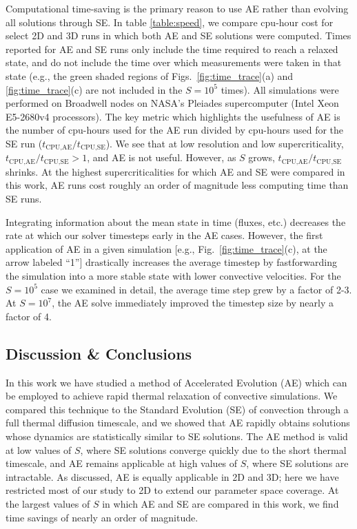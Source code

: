 Computational time-saving is the primary reason to use AE rather than 
evolving all solutions through SE.
In table 
\ref{table:speed}, we compare cpu-hour cost for select
2D and 3D runs in which both AE and SE solutions were computed. Times reported
for AE and SE runs only include the time required to reach a relaxed
state, and do not include the time over which measurements were taken
in that state (e.g., the green shaded regions of
Figs.~\ref{fig:time_trace}(a) and \ref{fig:time_trace}(c) are not included in the $S = 10^5$ times).
All simulations
were performed on Broadwell nodes on NASA's Pleiades supercomputer 
(Intel Xeon E5-2680v4 processors). The key metric which highlights the usefulness
of AE is the number of cpu-hours used for the AE run divided by cpu-hours used
for the SE run ($t_{\text{CPU,AE}}/t_{\text{CPU,SE}}$). We see that at low
resolution and low supercriticality, $t_{\text{CPU,AE}}/t_{\text{CPU,SE}} > 1$,
and AE is not useful. However, as $S$ grows, $t_{\text{CPU,AE}}/t_{\text{CPU,SE}}$
shrinks. At the highest supercriticalities for which AE and SE were compared
in this work, AE runs cost roughly an order of magnitude less computing time 
than SE runs.

Integrating information about the mean state in time (fluxes, etc.)
decreases the rate at which our solver timesteps early in the AE cases. 
However, 
the first application of AE in a given simulation 
[e.g., Fig.~\ref{fig:time_trace}(c), at the arrow labeled ``1''] drastically
increases the average timestep by fastforwarding the simulation into
a more stable state with lower convective velocities. 
For the $S = 10^5$ case we examined in detail, the
average time step grew by a factor of 2-3.
At $S = 10^7$, the AE solve immediately improved the timestep size 
by nearly a factor of 4.




\newpage
\subsection{Discussion \& Conclusions}
\label{sec:extensions}
In this work we have studied a method of Accelerated Evolution (AE) which can
be employed to achieve rapid thermal relaxation of convective simulations.  We compared
this technique to the Standard Evolution (SE) of convection through a full thermal diffusion timescale,
and we
showed that AE rapidly obtains solutions whose dynamics are statistically similar to SE solutions.
The AE method is valid at low values of $S$, where SE solutions
converge quickly due to the short thermal timescale, and AE remains applicable
at high values of $S$, where SE solutions are intractable.
As discussed, AE is equally applicable in 2D and 3D; here we have restricted most of our study to 2D
to extend our parameter space coverage.
At the largest values of $S$ in which AE and SE are compared in this work, we find
time savings of nearly an order of magnitude. 

